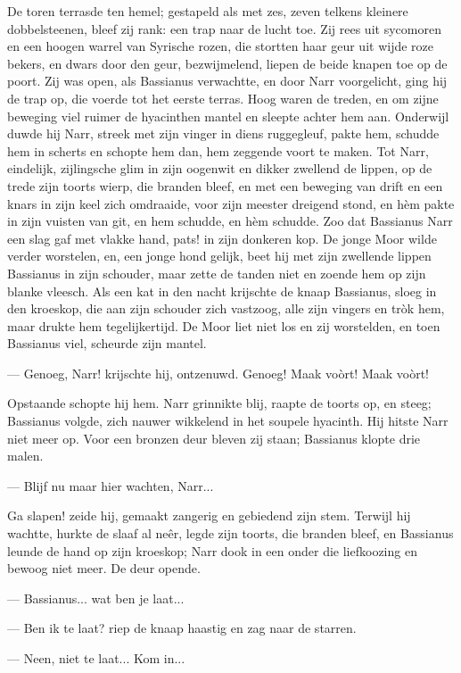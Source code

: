 \documentclass[a4paper, 12pt, oneside, dutch]{article}
\begin{document}
De toren terrasde ten hemel; gestapeld als met zes, zeven telkens kleinere dobbelsteenen, bleef zij rank: een trap naar de lucht toe. Zij rees uit sycomoren en een hoogen warrel van Syrische rozen, die stortten haar geur uit wijde roze bekers, en dwars door den geur, bezwijmelend, liepen de beide knapen toe op de poort. Zij was open, als Bassianus verwachtte, en door Narr voorgelicht, ging hij de trap op, die voerde tot het eerste terras. Hoog waren de treden, en om zijne beweging viel ruimer de hyacinthen mantel en sleepte achter hem aan. Onderwijl duwde hij Narr, streek met zijn vinger in diens ruggegleuf, pakte hem, schudde hem in scherts en schopte hem dan, hem zeggende voort te maken. Tot Narr, eindelijk, zijlingsche glim in zijn oogenwit en dikker zwellend de lippen, op de trede zijn toorts wierp, die branden bleef, en met een beweging van drift en een knars in zijn keel zich omdraaide, voor zijn meester dreigend stond, en hèm pakte in zijn vuisten van git, en hem schudde, en hèm schudde. Zoo dat Bassianus Narr een slag gaf met vlakke hand, pats! in zijn donkeren kop. De jonge Moor wilde verder worstelen, en, een jonge hond gelijk, beet hij met zijn zwellende lippen Bassianus in zijn schouder, maar zette de tanden niet en zoende hem op zijn blanke vleesch. Als een kat in den nacht krijschte de knaap Bassianus, sloeg in den kroeskop, die aan zijn schouder zich vastzoog, alle zijn vingers en tròk hem, maar drukte hem tegelijkertijd. De Moor liet niet los en zij worstelden, en toen Bassianus viel, scheurde zijn mantel.

--- Genoeg, Narr! krijschte hij, ontzenuwd. Genoeg! Maak voòrt! Maak voòrt!

Opstaande schopte hij hem. Narr grinnikte blij, raapte de toorts op, en steeg; Bassianus volgde, zich nauwer wikkelend in het soupele hyacinth. Hij hitste Narr niet meer op. Voor een bronzen deur bleven zij staan; Bassianus klopte drie malen.

--- Blijf nu maar hier wachten, Narr...

Ga slapen! zeide hij, gemaakt zangerig en gebiedend zijn stem. Terwijl hij wachtte, hurkte de slaaf al neêr, legde zijn toorts, die branden bleef, en Bassianus leunde de hand op zijn kroeskop; Narr dook in een onder die liefkoozing en bewoog niet meer. De deur opende.

--- Bassianus... wat ben je laat...

--- Ben ik te laat? riep de knaap haastig en zag naar de starren.

--- Neen, niet te laat... Kom in...
\end{document}
